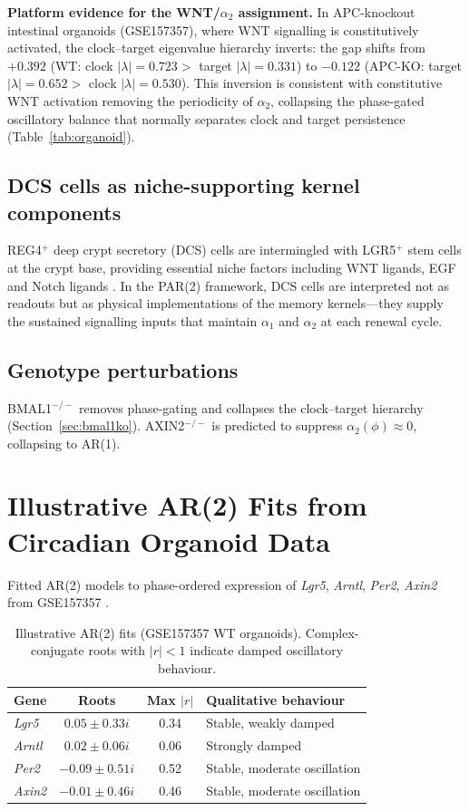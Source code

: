 \documentclass[11pt,letterpaper]{article}
\theoremstyle{definition}
\theoremstyle{remark}
\begin{document}
\textbf{Platform evidence for the WNT/$\alpha_2$ assignment.} In APC-knockout intestinal organoids (GSE157357), where WNT signalling is constitutively activated, the clock--target eigenvalue hierarchy inverts: the gap shifts from $+0.392$ (WT: clock $|\lambda| = 0.723 >$ target $|\lambda| = 0.331$) to $-0.122$ (APC-KO: target $|\lambda| = 0.652 >$ clock $|\lambda| = 0.530$). This inversion is consistent with constitutive WNT activation removing the periodicity of $\alpha_2$, collapsing the phase-gated oscillatory balance that normally separates clock and target persistence (Table~\ref{tab:organoid}).

\subsection{DCS cells as niche-supporting kernel components}

REG4$^+$ deep crypt secretory (DCS) cells are intermingled with LGR5$^+$ stem cells at the crypt base, providing essential niche factors including WNT ligands, EGF and Notch ligands \citep{sasaki2016reg4, nguyen2025colonic}. In the PAR(2) framework, DCS cells are interpreted not as readouts but as physical implementations of the memory kernels---they supply the sustained signalling inputs that maintain $\alpha_1$ and $\alpha_2$ at each renewal cycle.

\subsection{Genotype perturbations}

BMAL1$^{-/-}$ removes phase-gating and collapses the clock--target hierarchy (Section~\ref{sec:bmal1ko}). AXIN2$^{-/-}$ is predicted to suppress $\alpha_2(\phi) \approx 0$, collapsing to AR(1).

\section{Illustrative AR(2) Fits from Circadian Organoid Data}

Fitted AR(2) models to phase-ordered expression of \textit{Lgr5}, \textit{Arntl}, \textit{Per2}, \textit{Axin2} from GSE157357 \citep{stokes2021bmal1}.

\begin{table}[H]
\centering
\caption{Illustrative AR(2) fits (GSE157357 WT organoids). Complex-conjugate roots with $|r| < 1$ indicate damped oscillatory behaviour.}
\label{tab:ar2fits}
\begin{tabular}{lccl}
\toprule
\textbf{Gene} & \textbf{Roots} & \textbf{Max $|r|$} & \textbf{Qualitative behaviour} \\
\midrule
\textit{Lgr5} & $0.05 \pm 0.33i$ & 0.34 & Stable, weakly damped \\
\textit{Arntl} & $0.02 \pm 0.06i$ & 0.06 & Strongly damped \\
\textit{Per2} & $-0.09 \pm 0.51i$ & 0.52 & Stable, moderate oscillation \\
\textit{Axin2} & $-0.01 \pm 0.46i$ & 0.46 & Stable, moderate oscillation \\
\bottomrule
\end{tabular}
\end{table}
\end{document}

